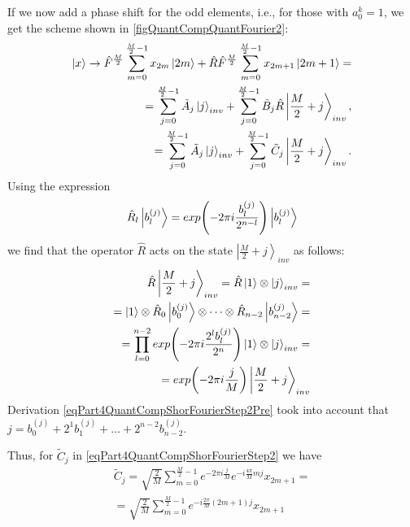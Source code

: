 

If we now add a phase shift for the odd elements, i.e., for those with $a_0^k = 1$, we get the scheme shown in \autoref{figQuantCompQuantFourier2}: 
\begin{eqnarray}
\ket{x} \rightarrow
\hat{F}^{\frac{M}{2}} \sum_{m = 0}^{\frac{M}{2} - 1}x_{2m} \ket{2m} +
\hat{R}\hat{F}^{\frac{M}{2}} \sum_{m = 0}^{\frac{M}{2} - 1} x_{2m + 1}
\ket{2m+1} =
\nonumber \\
= 
\sum^{\frac{M}{2} - 1}_{j = 0} \tilde{A}_{j} \ket{j}_{inv} +
\sum^{\frac{M}{2} - 1}_{j = 0}  
\tilde{B}_{j} \hat{R}\left|\frac{M}{2} + j\right>_{inv},
\nonumber \\
= 
\sum^{\frac{M}{2} - 1}_{j = 0}  \tilde{A}_{j} \ket{j}_{inv} +
\sum^{\frac{M}{2} - 1}_{j = 0}  
\tilde{C}_{j} \left|\frac{M}{2} + j\right>_{inv}.
\label{eqPart4QuantCompShorFourierStep2}
\end{eqnarray}
Using the expression
\begin{equation}
\hat{R}_l \ket{b^{(j)}_l} = 
exp{\left(- 2 \pi i \frac{b^{(j)}_l}{2^{n-l}}\right)}
\ket{b^{(j)}_l}
\nonumber
\end{equation}
we find that the operator $\hat{R}$ acts on the state 
$\left|\frac{M}{2} + j\right>_{inv}$ as follows:
\begin{eqnarray}
\hat{R}\left|\frac{M}{2} + j\right>_{inv} = 
\hat{R}\ket{1} \otimes  \ket{j}_{inv} = 
\nonumber \\
= 
\ket{1} \otimes \hat{R}_0 \ket{b^{(j)}_0}
\otimes \cdots \otimes \hat{R}_{n-2} \ket{b^{(j)}_{n-2}} = 
\nonumber \\
= 
\prod_{l = 0}^{n-2}exp{\left(- 2 \pi i \frac{2^lb^{(j)}_l}{2^n}\right)}
\ket{1} \otimes \ket{j}_{inv} = 
\nonumber \\
=
exp{\left(-2 \pi i \frac{j}{M}\right)}
\left|\frac{M}{2} + j\right>_{inv} 
\label{eqPart4QuantCompShorFourierStep2Pre}
\end{eqnarray}
Derivation \eqref{eqPart4QuantCompShorFourierStep2Pre} took into account that $j = b^{(j)}_0 + 2^1 b^{(j)}_1 + \dots + 2^{n-2} b^{(j)}_{n-2}$.

Thus, for $\tilde{C}_{j}$ in \eqref{eqPart4QuantCompShorFourierStep2} we have
\begin{eqnarray}
\tilde{C}_{j} = 
\sqrt{\frac{2}{M}} 
\sum_{m = 0}^{\frac{M}{2} - 1} 
e^{- 2 \pi i \frac{j}{M}}
e^{-i \frac{4 \pi}{M} m j} x_{2m+1} =
\nonumber \\
=
\sqrt{\frac{2}{M}} 
\sum_{m = 0}^{\frac{M}{2} - 1} 
e^{-i \frac{2 \pi}{M} \left(2m+1\right) j} x_{2m+1}
\label{eqPart4QuantCompShorC}
\end{eqnarray}

